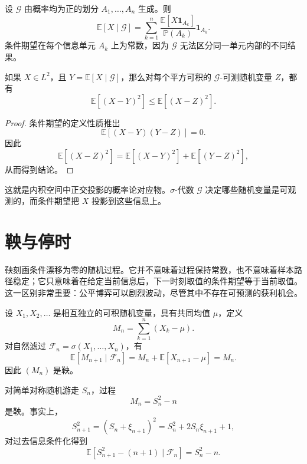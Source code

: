 \begin{example}[对有限划分条件化]
设 $\mathcal{G}$ 由概率均为正的划分 $A_1,\dots,A_n$ 生成。则
\[
    \mathbb{E}[X\mid\mathcal{G}]
    =\sum_{k=1}^n
    \frac{\mathbb{E}[X\mathbf{1}_{A_k}]}{\mathbb{P}(A_k)}
    \mathbf{1}_{A_k}.
\]
条件期望在每个信息单元 $A_k$ 上为常数，因为 $\mathcal{G}$ 无法区分同一单元内部的不同结果。
\end{example}

\begin{theorem}[最小二乘刻画]
如果 $X\in L^2$，且 $Y=\mathbb{E}[X\mid\mathcal{G}]$，那么对每个平方可积的 $\mathcal{G}$-可测随机变量 $Z$，都有
\[
    \mathbb{E}[(X-Y)^2]
    \leq
    \mathbb{E}[(X-Z)^2].
\]
\end{theorem}

\begin{proof}
条件期望的定义性质推出
\[
    \mathbb{E}[(X-Y)(Y-Z)]=0.
\]
因此
\[
    \mathbb{E}[(X-Z)^2]
    =\mathbb{E}[(X-Y)^2]
     +\mathbb{E}[(Y-Z)^2],
\]
从而得到结论。
\end{proof}

\begin{remark}
这就是内积空间中正交投影的概率论对应物。$\sigma$-代数 $\mathcal{G}$ 决定哪些随机变量是可观测的，而条件期望把 $X$ 投影到这些信息上。
\end{remark}

\section{鞅与停时}

鞅刻画条件漂移为零的随机过程。它并不意味着过程保持常数，也不意味着样本路径稳定；它只意味着在给定当前信息后，下一时刻取值的条件期望等于当前取值。这一区别非常重要：公平博弈可以剧烈波动，尽管其中不存在可预测的获利机会。

\begin{example}[中心化部分和]
设 $X_1,X_2,\dots$ 是相互独立的可积随机变量，具有共同均值 $\mu$，定义
\[
    M_n=\sum_{k=1}^n(X_k-\mu).
\]
对自然滤过 $\mathcal{F}_n=\sigma(X_1,\dots,X_n)$，有
\[
    \mathbb{E}[M_{n+1}\mid\mathcal{F}_n]
    =M_n+\mathbb{E}[X_{n+1}-\mu]
    =M_n.
\]
因此 $(M_n)$ 是鞅。
\end{example}

\begin{example}[变换后的随机游走]
对简单对称随机游走 $S_n$，过程
\[
    M_n=S_n^2-n
\]
是鞅。事实上，
\[
    S_{n+1}^2=(S_n+\xi_{n+1})^2
    =S_n^2+2S_n\xi_{n+1}+1,
\]
对过去信息条件化得到
\[
    \mathbb{E}[S_{n+1}^2-(n+1)\mid\mathcal{F}_n]
    =S_n^2-n.
\]
\end{example}

